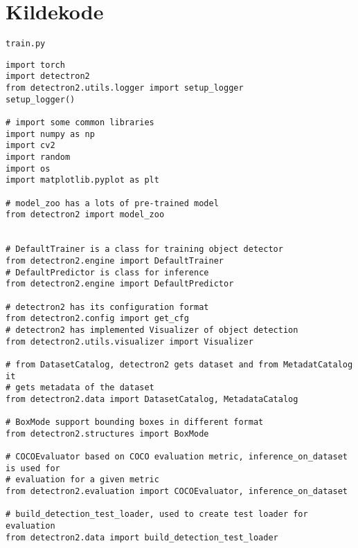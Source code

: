 \clearpage
\appendix
{}
\setcounter{page}{1}

\pagestyle{fancy}

\section{Kildekode}
\label{appendix:code}

\begin{verbatim}
train.py
\end{verbatim}


\label{lst:load}
\begin{verbatim}
import torch
import detectron2
from detectron2.utils.logger import setup_logger
setup_logger()

# import some common libraries
import numpy as np
import cv2
import random
import os
import matplotlib.pyplot as plt

# model_zoo has a lots of pre-trained model
from detectron2 import model_zoo


# DefaultTrainer is a class for training object detector
from detectron2.engine import DefaultTrainer
# DefaultPredictor is class for inference
from detectron2.engine import DefaultPredictor

# detectron2 has its configuration format
from detectron2.config import get_cfg
# detectron2 has implemented Visualizer of object detection
from detectron2.utils.visualizer import Visualizer

# from DatasetCatalog, detectron2 gets dataset and from MetadatCatalog it
# gets metadata of the dataset
from detectron2.data import DatasetCatalog, MetadataCatalog

# BoxMode support bounding boxes in different format
from detectron2.structures import BoxMode

# COCOEvaluator based on COCO evaluation metric, inference_on_dataset is used for
# evaluation for a given metric
from detectron2.evaluation import COCOEvaluator, inference_on_dataset

# build_detection_test_loader, used to create test loader for evaluation
from detectron2.data import build_detection_test_loader
\end{verbatim}

\label{lst:config}

